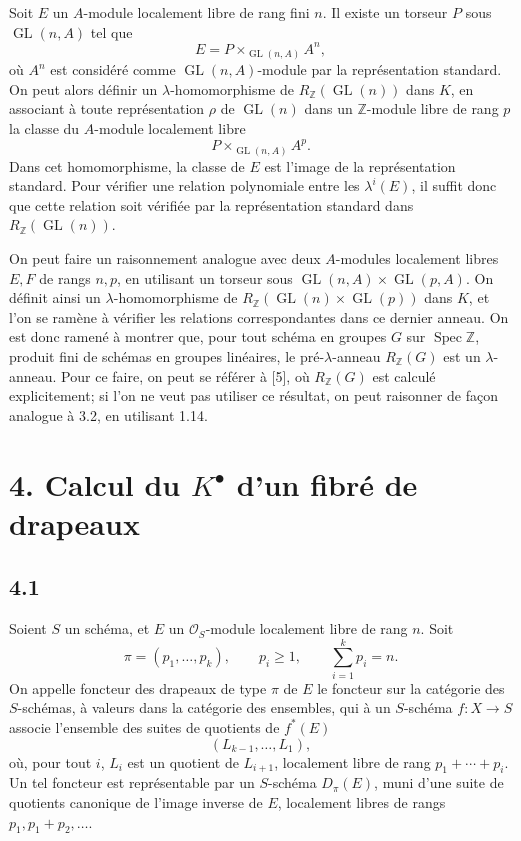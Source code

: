 \documentclass[11pt]{article}
\newcommand{\Spec}{\operatorname{Spec}}
\providecommand{\GL}{\operatorname{GL}}
\begin{document}
Soit \(E\) un \(A\)-module localement libre de rang fini \(n\). Il existe un torseur \(P\) sous \(\GL(n,A)\) tel que
\[
  E=P\times_{\GL(n,A)} A^n,
\]
où \(A^n\) est considéré comme \(\GL(n,A)\)-module par la représentation standard. On peut alors définir un \(\lambda\)-homomorphisme de \(R_{\mathbb Z}(\GL(n))\) dans \(K\), en associant à toute représentation \(\rho\) de \(\GL(n)\) dans un \(\mathbb Z\)-module libre de rang \(p\) la classe du \(A\)-module localement libre
\[
  P\times_{\GL(n,A)} A^p.
\]
Dans cet homomorphisme, la classe de \(E\) est l'image de la représentation standard. Pour vérifier une relation polynomiale entre les \(\lambda^i(E)\), il suffit donc que cette relation soit vérifiée par la représentation standard dans \(R_{\mathbb Z}(\GL(n))\).

On peut faire un raisonnement analogue avec deux \(A\)-modules localement libres \(E,F\) de rangs \(n,p\), en utilisant un torseur sous \(\GL(n,A)\times\GL(p,A)\). On définit ainsi un \(\lambda\)-homomorphisme de \(R_{\mathbb Z}(\GL(n)\times\GL(p))\) dans \(K\), et l'on se ramène à vérifier les relations correspondantes dans ce dernier anneau. On est donc ramené à montrer que, pour tout schéma en groupes \(G\) sur \(\Spec\mathbb Z\), produit fini de schémas en groupes linéaires, le pré-\(\lambda\)-anneau \(R_{\mathbb Z}(G)\) est un \(\lambda\)-anneau. Pour ce faire, on peut se référer à [5], où \(R_{\mathbb Z}(G)\) est calculé explicitement; si l'on ne veut pas utiliser ce résultat, on peut raisonner de façon analogue à 3.2, en utilisant 1.14.

\section*{4. Calcul du \(K^\bullet\) d'un fibré de drapeaux}

\subsection*{4.1}
Soient \(S\) un schéma, et \(E\) un \(\mathcal O_S\)-module localement libre de rang \(n\). Soit
\[
  \pi=(p_1,\ldots,p_k),\qquad p_i\geq1,
  \qquad \sum_{i=1}^k p_i=n.
\]
On appelle foncteur des drapeaux de type \(\pi\) de \(E\) le foncteur sur la catégorie des \(S\)-schémas, à valeurs dans la catégorie des ensembles, qui à un \(S\)-schéma \(f:X\to S\) associe l'ensemble des suites de quotients de \(f^*(E)\)
\[
  (L_{k-1},\ldots,L_1),
\]
où, pour tout \(i\), \(L_i\) est un quotient de \(L_{i+1}\), localement libre de rang \(p_1+\cdots+p_i\). Un tel foncteur est représentable par un \(S\)-schéma \(D_\pi(E)\), muni d'une suite de quotients canonique de l'image inverse de \(E\), localement libres de rangs \(p_1,p_1+p_2,\ldots\).
\end{document}
